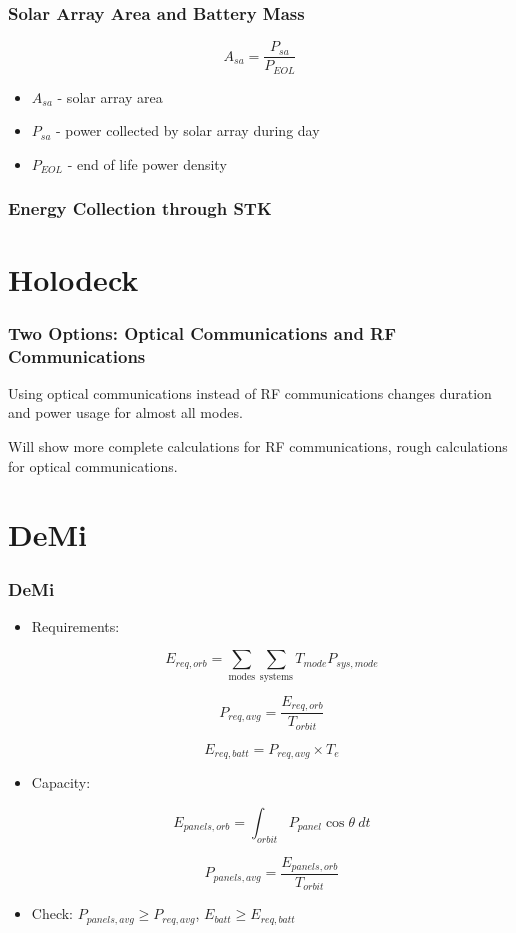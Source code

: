 \documentclass{beamer}
\begin{document}
\begin{frame}
  \frametitle{Solar Array Area and Battery Mass}
  \[A_{sa} = \frac{P_{sa}}{P_{EOL}}\]

  \begin{itemize}
    \item $A_{sa}$ - solar array area
    \item $P_{sa}$ - power collected by solar array during day
    \item $P_{EOL}$ - end of life power density
  \end{itemize}
\end{frame}

\begin{frame}
  \frametitle{Energy Collection through STK}
\end{frame}

\section{Holodeck}
\begin{frame}
  \frametitle{Two Options: Optical Communications and RF Communications}
  \begin{center}
    Using optical communications instead of RF communications changes
    duration and power usage for almost all modes.

    Will show more complete calculations for RF communications, rough
    calculations for optical communications.
  \end{center}
\end{frame}

\section{DeMi}

\begin{frame}
	\frametitle{DeMi}
	\begin{itemize}
		\item Requirements:
		
	\[ E_{req,orb} = \sum_\text{modes}{\sum_\text{systems}{T_{mode}P_{sys,mode}}} \]
	
	\[  P_{req,avg} = \frac{E_{req,orb}}{T_{orbit}} \]
	
	\[ E_{req,batt} = P_{req,avg} \times T_e\]
	
	\item Capacity:
	
	\[ E_{panels,orb} = \int_{orbit}{P_{panel}\cos\theta \ dt } \]
	
	\[  P_{panels,avg} = \frac{E_{panels,orb}}{T_{orbit}} \]
	
	\item Check: $P_{panels,avg} \geq P_{req,avg}$, $E_{batt} \geq E_{req,batt}$
	
	\end{itemize}
	
	
\end{frame}
\end{document}

